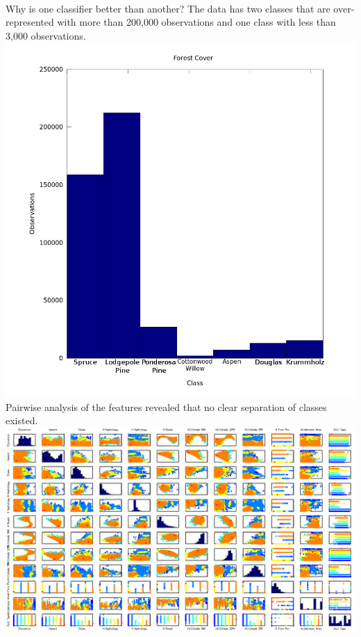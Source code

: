 \documentclass[11pt]{article}
\begin{document}
\paragraph{}
Why is one classifier better than another?
The data has two classes that are over-represented with more than 200,000 observations and one class with less than 3,000 observations. \\
\includegraphics[width=\linewidth]{images/description.png} 
Pairwise analysis of the features revealed that no clear separation of classes existed.\\
\includegraphics[width=\linewidth]{images/featureScatterPlotMatrixHD}
\end{document}
